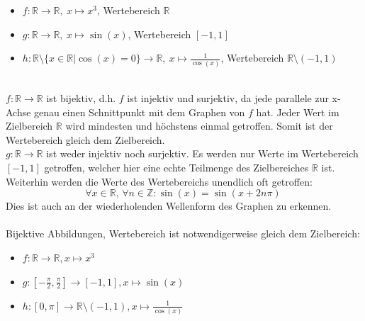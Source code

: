 \documentclass[a4paper,graphics,11pt]{article}
\begin{document}
\begin{tasks}
    \task   \begin{itemize}
        \item $f \colon \mathbb{R} \rightarrow \mathbb{R},\ x \mapsto x^3$,
            Wertebereich $\mathbb{R}$
        \item $g \colon \mathbb{R} \rightarrow \mathbb{R},\ x \mapsto \sin(x)$,
            Wertebereich $[-1,1]$ 
        \item $h \colon \mathbb{R} \setminus \{x \in \mathbb{R} \vert \cos(x) = 0\} \rightarrow \mathbb{R} ,\ x \mapsto \frac{1}{\cos(x)}$, Wertebereich $\mathbb{R} \setminus (-1,1)$
            \end{itemize}

    \task\\
        $f \colon \mathbb{R} \rightarrow \mathbb{R}$
        ist bijektiv, d.h. $f$ ist injektiv und surjektiv, da jede
        parallele zur x-Achse genau einen Schnittpunkt mit dem Graphen
        von $f$ hat. Jeder Wert im Zielbereich $\mathbb{R}$ wird mindesten
        und höchstens einmal getroffen. Somit ist der Wertebereich gleich dem
        Zielbereich.\\

        $g \colon \mathbb{R} \rightarrow \mathbb{R}$
        ist weder injektiv noch surjektiv. Es werden nur Werte im
        Wertebereich $[-1,1]$ getroffen, welcher hier eine echte Teilmenge des
        Zielbereiches $\mathbb{R}$ ist.
        Weiterhin werden die Werte des Wertebereichs unendlich oft getroffen:
        $$\forall x \in \mathbb{R},\,\forall n \in \mathbb{Z}\colon\sin(x) = \sin(x+2n\pi)\ $$
        Dies ist auch an der wiederholenden Wellenform des Graphen zu erkennen.\\

    \task\\Bijektive Abbildungen, Wertebereich ist notwendigerweise gleich dem Zielbereich:
        \begin{itemize}
            \item $f: \mathbb{R} \rightarrow \mathbb{R}, x \mapsto x^3$
            \item $g: [-\frac{\pi}{2}, \frac{\pi}{2}] \rightarrow [-1,1], x \mapsto \sin(x)$
            \item $h: [0,\pi] \rightarrow \mathbb{R} \setminus (-1,1), x \mapsto \frac{1}{\cos(x)}$
        \end{itemize}
\end{tasks}
\end{document}
